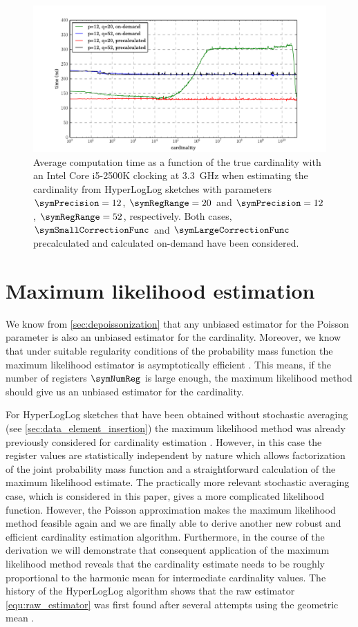 \documentclass[a4paper]{scrartcl}
\begin{document}
\begin{figure}
\centering
\includegraphics[width=1\textwidth]{corrected_raw_avg_exec_time}
\caption{Average computation time as a function of the true cardinality with an Intel Core i5-2500K clocking at \SI{3.3}{\giga\hertz} when estimating the cardinality from HyperLogLog sketches with parameters $\symPrecision=12$, $\symRegRange=20$ and $\symPrecision=12$, $\symRegRange=52$, respectively. Both cases, $\symSmallCorrectionFunc$ and $\symLargeCorrectionFunc$ precalculated and calculated on-demand have been considered.}
\label{fig:corrected_raw_avg_exec_time}
\end{figure}

\section{Maximum likelihood estimation}
\label{sec:max_likelihood_estimation}
We know from \cref{sec:depoissonization} that any unbiased estimator for the Poisson parameter is also an unbiased estimator for the cardinality. Moreover, we know that under suitable regularity conditions of the probability mass function the maximum likelihood estimator is asymptotically efficient \cite{Casella2002}. This means, if the number of registers $\symNumReg$ is large enough, the maximum likelihood method should give us an unbiased estimator for the cardinality.

For HyperLogLog sketches that have been obtained without stochastic averaging (see \cref{sec:data_element_insertion}) the maximum likelihood method was already previously considered for cardinality estimation \cite{Clifford2012}. However, in this case the register values are statistically independent by nature which 
allows factorization of the joint probability mass function and a straightforward calculation of the maximum likelihood estimate. The practically more relevant stochastic averaging case, which is considered in this paper, gives a more complicated likelihood function. However, the Poisson approximation makes the maximum likelihood method feasible again and we are finally able to derive another new robust and efficient cardinality estimation algorithm. Furthermore, in the course of the derivation we will demonstrate that consequent application of the maximum likelihood method reveals that the cardinality estimate needs to be roughly proportional to the harmonic mean for intermediate cardinality values. The history of the HyperLogLog algorithm shows that the raw estimator \eqref{equ:raw_estimator} was first found after several attempts using the geometric mean \cite{Flajolet2007, Durand2003}.
\end{document}
